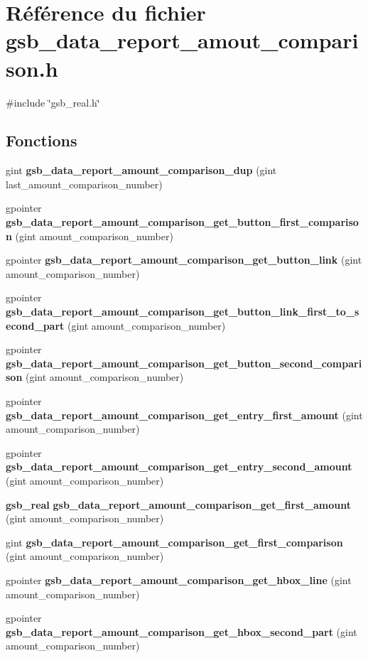 \section{Référence du fichier gsb\_\-data\_\-report\_\-amout\_\-comparison.h}
\label{gsb__data__report__amout__comparison_8h}
{\ttfamily \#include \char`\"{}gsb\_\-real.h\char`\"{}}\par
\subsection*{Fonctions}
\begin{DoxyCompactItemize}
\item 
gint {\bf gsb\_\-data\_\-report\_\-amount\_\-comparison\_\-dup} (gint last\_\-amount\_\-comparison\_\-number)
\item 
gpointer {\bf gsb\_\-data\_\-report\_\-amount\_\-comparison\_\-get\_\-button\_\-first\_\-comparison} (gint amount\_\-comparison\_\-number)
\item 
gpointer {\bf gsb\_\-data\_\-report\_\-amount\_\-comparison\_\-get\_\-button\_\-link} (gint amount\_\-comparison\_\-number)
\item 
gpointer {\bf gsb\_\-data\_\-report\_\-amount\_\-comparison\_\-get\_\-button\_\-link\_\-first\_\-to\_\-second\_\-part} (gint amount\_\-comparison\_\-number)
\item 
gpointer {\bf gsb\_\-data\_\-report\_\-amount\_\-comparison\_\-get\_\-button\_\-second\_\-comparison} (gint amount\_\-comparison\_\-number)
\item 
gpointer {\bf gsb\_\-data\_\-report\_\-amount\_\-comparison\_\-get\_\-entry\_\-first\_\-amount} (gint amount\_\-comparison\_\-number)
\item 
gpointer {\bf gsb\_\-data\_\-report\_\-amount\_\-comparison\_\-get\_\-entry\_\-second\_\-amount} (gint amount\_\-comparison\_\-number)
\item 
{\bf gsb\_\-real} {\bf gsb\_\-data\_\-report\_\-amount\_\-comparison\_\-get\_\-first\_\-amount} (gint amount\_\-comparison\_\-number)
\item 
gint {\bf gsb\_\-data\_\-report\_\-amount\_\-comparison\_\-get\_\-first\_\-comparison} (gint amount\_\-comparison\_\-number)
\item 
gpointer {\bf gsb\_\-data\_\-report\_\-amount\_\-comparison\_\-get\_\-hbox\_\-line} (gint amount\_\-comparison\_\-number)
\item 
gpointer {\bf gsb\_\-data\_\-report\_\-amount\_\-comparison\_\-get\_\-hbox\_\-second\_\-part} (gint amount\_\-comparison\_\-number)

\end{DoxyCompactItemize}
